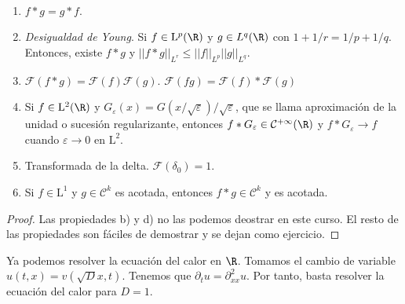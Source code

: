 \documentclass{article}
\begin{document}
\begin{proposition}~

  \begin{enumerate}
  \item $f * g = g*f$.
  \item \emph{Desigualdad de Young}. Si $f \in \mathrm{L}^p(\R)$ y $g \in L^q(\R)$ con
    $1+1/r = 1/p + 1/q$. Entonces, existe $f * g$ y $||f*g||_{L^r} \le ||f||_{L^p}||g||_{L^q}$.
  \item $\mathcal{F}(f*g) = \mathcal{F}(f) \mathcal{F}(g)$.
    $\mathcal{F}(fg) = \mathcal{F}(f) * \mathcal{F}(g)$
  \item Si $f \in \mathrm{L}^2(\R)$ y
    $G_{\varepsilon}(x) = G(x/ \sqrt{\varepsilon}) / \sqrt{\varepsilon}$, que se llama aproximación
    de la unidad o sucesión regularizante, entonces
    $f * G_{\varepsilon} \in \mathcal{C}^{+\infty}(\R)$ y $f * G_{\varepsilon} \to f$ cuando
    $\varepsilon \to 0$ en $\mathrm{L}^2$.
  \item Transformada de la delta. $\mathcal{F}(\delta_0) = 1$.
  \item Si $f\in \mathrm{L}^1$ y $g \in \mathcal{C}^k$ es acotada, entonces $f*g \in \mathcal{C}^k$
    y es acotada.
  \end{enumerate}
\end{proposition}
\begin{proof}
  Las propiedades b) y d) no las podemos deostrar en este curso. El resto de las propiedades son
  fáciles de demostrar y se dejan como ejercicio.
\end{proof}

Ya podemos resolver la ecuación del calor en $\R$. Tomamos el cambio de variable
$u(t,x) = v(\sqrt{D}x, t)$. Tenemos que $\partial_t u = \partial_{xx}^2 u$. Por tanto, basta
resolver la ecuación del calor para $D = 1$.
\end{document}
